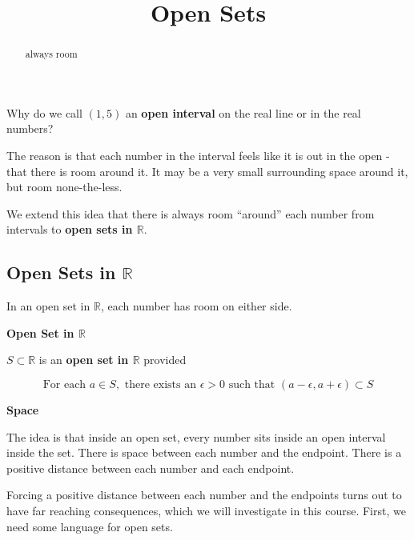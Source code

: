 \documentclass{ximera}
\title{Open Sets}
\begin{document}
\begin{abstract}
always room
\end{abstract}
\maketitle





Why do we call $(1, 5)$ an \textbf{open interval} on the real line or in the real numbers? 



The reason is that each number in the interval feels like it is out in the open - that there is room around it.  It may be a very small surrounding space around it, but room none-the-less.  


We extend this idea that there is always room ``around'' each number from intervals to \textbf{open sets in $\mathbb{R}$}.






\subsection*{Open Sets in $\mathbb{R}$}

In an open set in $\mathbb{R}$, each number has room on either side.  




\begin{definition}  \textbf{\textcolor{green!50!black}{Open Set in $\mathbb{R}$}}


$S \subset \mathbb{R}$ is an \textbf{open set in $\mathbb{R}$} provided 

\[
\text{For each } a \in S, \text{ there exists an } \epsilon > 0 \text{ such that }  (a - \epsilon, a + \epsilon) \subset S
\]

\end{definition}



\begin{idea} \textbf{\textcolor{blue!55!black}{Space}} 

The idea is that inside an open set, every number sits inside an open interval inside the set.  There is space between each number and the endpoint. There is a positive distance between each number and each endpoint.
\end{idea}

Forcing a positive distance between each number and the endpoints turns out to have far reaching consequences, which we will investigate in this course.  First, we need some language for open sets. 
\end{document}
